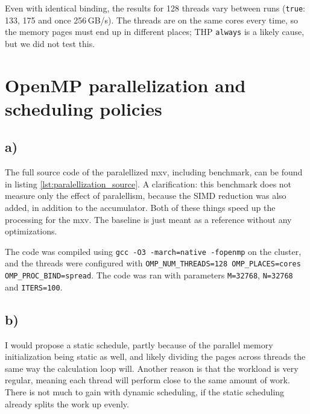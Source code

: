 \documentclass[a4paper,11pt]{article}
\begin{document}
Even with identical binding, the results for 128 threads vary between runs (\texttt{true}: 133, 175 and once 256\,GB/s). The threads are on the same cores every time, so the memory pages must end up in different places; THP \texttt{always} is a likely cause, but we did not test this.

\section{OpenMP parallelization and scheduling policies}

\subsection{a)}

The full source code of the paralellized mxv, including benchmark, can be found in listing \ref{lst:paralellization_source}. A clarification: this benchmark does not measure only the effect of paralellism, because the SIMD reduction was also added, in addition to the accumulator. Both of these things speed up the processing for the mxv. The baseline is just meant as a reference without any optimizations.

The code was compiled using \texttt{gcc -O3 -march=native -fopenmp} on the cluster, and the threads were configured with \texttt{OMP\_NUM\_THREADS=128 OMP\_PLACES=cores OMP\_PROC\_BIND=spread}. The code was ran with parameters \texttt{M=32768}, \texttt{N=32768} and \texttt{ITERS=100}.

\subsection{b)}
I would propose a static schedule, partly because of the parallel memory initialization being static as well, and likely dividing the pages across threads the same way the calculation loop will. Another reason is that the workload is very regular, meaning each thread will perform close to the same amount of work. There is not much to gain with dynamic scheduling, if the static scheduling already splits the work up evenly.
\end{document}
